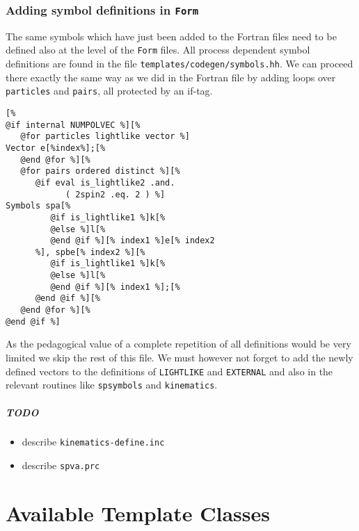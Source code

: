 \documentclass[11pt,a4paper]{refrep}
\newcommand{\form}{{\tt Form}\xspace}
\begin{document}
\subsection{Adding symbol definitions in \form}
The same symbols which have just been added to the Fortran files
need to be defined also at the level of the \form{} files.
All process dependent symbol definitions are found in the file
\texttt{templates/\hspace{0pt}codegen/\hspace{0pt}symbols.hh}.
We can proceed there exactly the same way as we did in the Fortran file
by adding loops over \texttt{particles} and \texttt{pairs}, all protected
by an if-tag.
\begin{lstlisting}
[%
@if internal NUMPOLVEC %][%
   @for particles lightlike vector %]
Vector e[%index%];[%
   @end @for %][%
   @for pairs ordered distinct %][%
      @if eval is_lightlike2 .and.
            ( 2spin2 .eq. 2 ) %]
Symbols spa[%
         @if is_lightlike1 %]k[%
         @else %]l[%
         @end @if %][% index1 %]e[% index2
      %], spbe[% index2 %][%
         @if is_lightlike1 %]k[%
         @else %]l[%
         @end @if %][% index1 %];[%
      @end @if %][%
   @end @for %][%
@end @if %]
\end{lstlisting}
As the pedagogical value of a complete repetition of all definitions would
be very limited we skip the rest of this file. We must however not forget
to add the newly defined vectors to the definitions of \texttt{LIGHTLIKE}
and \texttt{EXTERNAL} and also in the relevant routines like
\texttt{spsymbols} and \texttt{kinematics}.

\paragraph{TODO}
\begin{itemize}
\item describe \texttt{kinematics-define.inc}
\item describe \texttt{spva.prc}
\end{itemize}

\appendix
{}
\chapter{Available Template Classes}
\label{appendix:template-classes}
\end{document}
